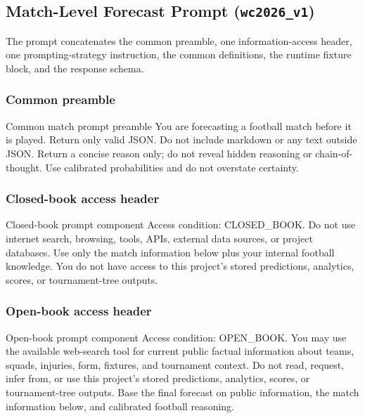\documentclass[sigconf,nonacm]{acmart}
\newcommand{\promptheadingbreak}{\leavevmode\par\nopagebreak[4]}
\begin{document}
\subsection{Match-Level Forecast Prompt (\texttt{wc2026\_v1})}

The prompt concatenates the common preamble, one information-access header, one prompting-strategy instruction, the common definitions, the runtime fixture block, and the response schema.

\subsubsection*{Common preamble}
\promptheadingbreak
\begin{promptbox}{Common match prompt preamble}
You are forecasting a football match before it is played.
Return only valid JSON. Do not include markdown or any text outside JSON.
Return a concise reason only; do not reveal hidden reasoning or chain-of-thought.
Use calibrated probabilities and do not overstate certainty.
\end{promptbox}

\subsubsection*{Closed-book access header}
\promptheadingbreak
\begin{promptbox}{Closed-book prompt component}
Access condition: CLOSED_BOOK.
Do not use internet search, browsing, tools, APIs, external data sources, or project databases.
Use only the match information below plus your internal football knowledge.
You do not have access to this project's stored predictions, analytics, scores, or tournament-tree outputs.
\end{promptbox}

\subsubsection*{Open-book access header}
\promptheadingbreak
\begin{promptbox}{Open-book prompt component}
Access condition: OPEN_BOOK.
You may use the available web-search tool for current public factual information about teams, squads, injuries, form, fixtures, and tournament context.
Do not read, request, infer from, or use this project's stored predictions, analytics, scores, or tournament-tree outputs.
Base the final forecast on public information, the match information below, and calibrated football reasoning.
\end{promptbox}
\end{document}
